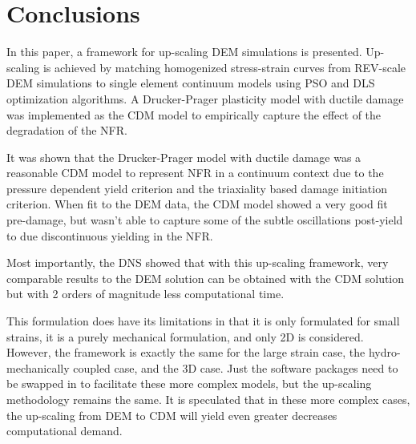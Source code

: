 \section{Conclusions}
In this paper, a framework for up-scaling DEM simulations is presented. Up-scaling is achieved by matching homogenized stress-strain curves from REV-scale DEM simulations to single element continuum models using PSO and DLS optimization algorithms. A Drucker-Prager plasticity model with ductile damage was implemented as the CDM model to empirically capture the effect of the degradation of the NFR.

It was shown that the Drucker-Prager model with ductile damage was a reasonable CDM model to represent NFR in a continuum context due to the pressure dependent yield criterion and the triaxiality based damage initiation criterion. When fit to the DEM data, the CDM model showed a very good fit pre-damage, but wasn't able to capture some of the subtle oscillations post-yield to due discontinuous yielding in the NFR.

Most importantly, the DNS showed that with this up-scaling framework, very comparable results to the DEM solution can be obtained with the CDM solution but with 2 orders of magnitude less computational time.

This formulation does have its limitations in that it is only formulated for small strains, it is a purely mechanical formulation, and only 2D is considered. However, the framework is exactly the same for the large strain case, the hydro-mechanically coupled case, and the 3D case. Just the software packages need to be swapped in to facilitate these more complex models, but the up-scaling methodology remains the same. It is speculated that in these more complex cases, the up-scaling from DEM to CDM will yield even greater decreases computational demand. 











\clearpage
